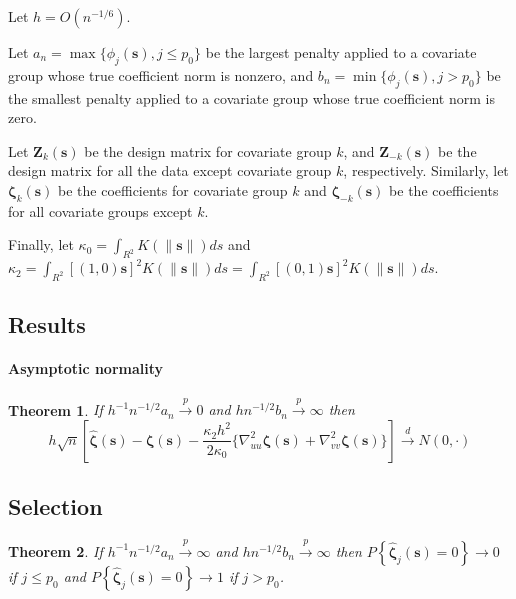 \documentclass[authoryear, review, 11pt]{elsarticle}
\newtheorem{theorem}{Theorem}[section]
\begin{document}
        Let $h = O(n^{-1/6})$.
        
        Let $a_n = \max \{ \phi_j(\bm{s}), j \le p_0 \}$ be the largest penalty applied to a covariate group whose true coefficient norm is nonzero, and $b_n = \min \{ \phi_j(\bm{s}), j > p_0 \}$ be the smallest penalty applied to a covariate group whose true coefficient norm is zero.
        
        Let $\bm{Z}_k(\bm{s})$ be the design matrix for covariate group $k$, and $\bm{Z}_{-k}(\bm{s})$ be the design matrix for all the data except covariate group $k$, respectively. Similarly, let $\bm{\zeta}_k(\bm{s})$ be the coefficients for covariate group $k$ and $\bm{\zeta}_{-k}(\bm{s})$ be the coefficients for all covariate groups except $k$.

        Finally, let $\kappa_0 = \int_{R^2} K(\|\bm{s}\|) ds$ and $\kappa_2 = \int_{R^2} [(1,0)\bm{s}]^2 K(\|\bm{s}\|) ds = \int_{R^2} [(0,1)\bm{s}]^2 K(\|\bm{s}\|) ds$.

        \subsection{Results}
        \paragraph{Asymptotic normality}
        \begin{theorem} \label{theorem:normality} 
            If $h^{-1} n^{-1/2} a_n \xrightarrow{p} 0$ and $h n^{-1/2} b_n \xrightarrow{p} \infty$ then \[h \sqrt{n} \left[ \hat{\bm{\zeta}}(\bm{s}) - \bm{\zeta}(\bm{s}) - \frac{\kappa_2 h^2}{2 \kappa_0} \{ \nabla_{uu}^2 \bm{\zeta} (\bm{s}) + \nabla_{vv}^2 \bm{\zeta}(\bm{s}) \} \right] \xrightarrow{d} N(0, \cdot)\]
        \end{theorem}
  
        


    \subsection{Selection}
    
        \begin{theorem} \label{theorem:selection}  
            If $h^{-1} n^{-1/2} a_n \xrightarrow{p} \infty$ and $h n^{-1/2} b_n \xrightarrow{p} \infty$ then $P \left\{ \hat{\bm{\zeta}}_j (\bm{s}) = 0 \right\} \to 0$ if $j \le p_0$ and $P \left\{ \hat{\bm{\zeta}}_j (\bm{s}) = 0 \right\} \to 1$ if $j > p_0$.
        \end{theorem}
\end{document}

